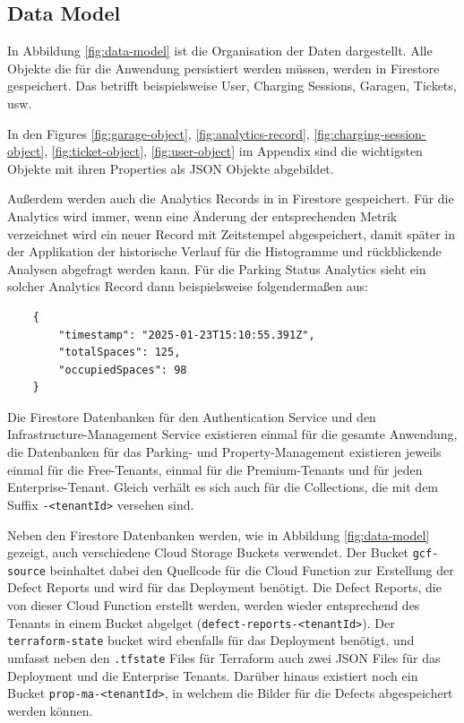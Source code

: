 \subsection{Data Model}

In Abbildung \ref{fig:data-model} ist die Organisation der Daten dargestellt. Alle Objekte die für die Anwendung persistiert werden müssen, werden in Firestore gespeichert. Das betrifft beispielsweise User, Charging Sessions, Garagen, Tickets, usw. 

In den Figures \ref{fig:garage-object}, \ref{fig:analytics-record}, \ref{fig:charging-session-object}, \ref{fig:ticket-object}, \ref{fig:user-object} im Appendix sind die wichtigsten Objekte mit ihren Properties als JSON Objekte abgebildet.


Außerdem werden auch die Analytics Records in in Firestore gespeichert. Für die Analytics wird immer, wenn eine Änderung der entsprechenden Metrik verzeichnet wird ein neuer Record mit Zeitstempel abgespeichert, damit später in der Applikation der historische Verlauf für die Histogramme und rückblickende Analysen abgefragt werden kann. Für die Parking Status Analytics sieht ein solcher Analytics Record dann beispielsweise folgendermaßen aus:

\begin{verbatim}
    {
        "timestamp": "2025-01-23T15:10:55.391Z",
        "totalSpaces": 125,
        "occupiedSpaces": 98
    }
\end{verbatim}

Die Firestore Datenbanken für den Authentication Service und den Infrastructure-Management Service existieren einmal für die gesamte Anwendung, die Datenbanken für das Parking- und Property-Management existieren jeweils einmal für die Free-Tenants, einmal für die Premium-Tenants und für jeden Enterprise-Tenant. Gleich verhält es sich auch für die Collections, die mit dem Suffix \verb|-<tenantId>| versehen sind.

Neben den Firestore Datenbanken werden, wie in Abbildung \ref{fig:data-model} gezeigt, auch verschiedene Cloud Storage Buckets verwendet. Der Bucket \verb|gcf-source| beinhaltet dabei den Quellcode für die Cloud Function zur Erstellung der Defect Reports und wird für das Deployment benötigt. Die Defect Reports, die von dieser Cloud Function erstellt werden, werden wieder entsprechend des Tenants in einem Bucket abgelget (\verb|defect-reports-<tenantId>|). Der \verb|terraform-state| bucket wird ebenfalls für das Deployment benötigt, und umfasst neben den \verb|.tfstate| Files für Terraform auch zwei JSON Files für das Deployment und die Enterprise Tenants.
Darüber hinaus existiert noch ein Bucket \verb|prop-ma-<tenantId>|, in welchem die Bilder für die Defects abgespeichert werden können.

